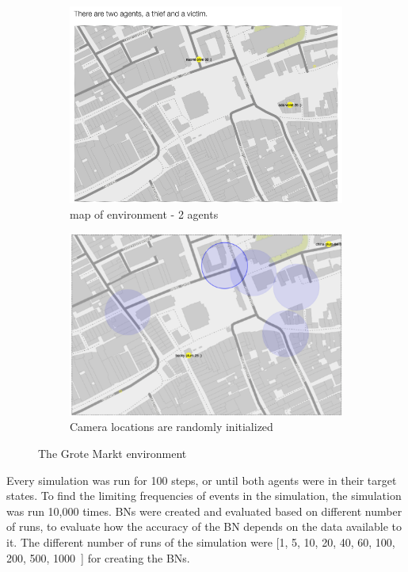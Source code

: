 \documentclass[11pt]{article}
\begin{document}
\begin{figure}[htbp]
\begin{center}
\begin{subfigure}{.5\textwidth}
\includegraphics[width=\linewidth]{images/grotemarktmap.png}
\caption{map of environment - 2 agents}
\end{subfigure}%
\begin{subfigure}{.5\textwidth}
\includegraphics[width=\linewidth]{images/agentGM.png}
\caption{Camera locations are randomly initialized}
\end{subfigure}%
\caption{The Grote Markt environment}
\label{groteMarkt}
\end{center}
\end{figure}



Every simulation was run for 100 steps, or until both agents were in their target states. To find the limiting frequencies of events in the simulation, the simulation was run 10,000 times. BNs were created and evaluated based on different number of runs, to evaluate how the accuracy of the BN depends on the data available to it. The different number of runs of the simulation were [1, 5, 10, 20, 40, 60, 100, 200, 500, 1000~] for creating the BNs.
\end{document}

